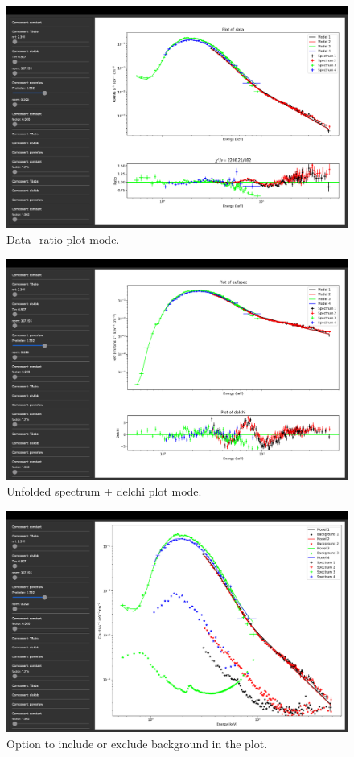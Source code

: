 \documentclass[11pt]{article}
\begin{document}
\begin{figure}[H]
    \centering
    \includegraphics[width=0.7\linewidth]{documentation_images/plot_data_data+ratio.png}
    \caption{Data+ratio plot mode.}
\end{figure}

\begin{figure}[H]
    \centering
    \includegraphics[width=0.7\linewidth]{documentation_images/plot_data_eufspec+delchi.png}
    \caption{Unfolded spectrum + delchi plot mode.}
\end{figure}

\begin{figure}[H]
    \centering
    \includegraphics[width=0.7\linewidth]{documentation_images/include_background.png}
    \caption{Option to include or exclude background in the plot.}
\end{figure}
\end{document}
